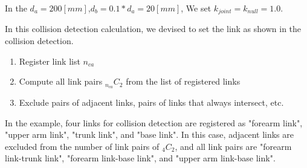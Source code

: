 In the 
$d_a = 200[mm]$,$d_b = 0.1 * d_a = 20[mm]$,
We set $k_{joint} = k_{null} = 1.0$.

In this collision detection calculation, we devised to set the link as shown in the collision detection.
\begin{enumerate}
\item Register link list $n_{ca}$
\item Compute all link pairs $_{n_{ca}}C_2$ from the list of registered links
\item Exclude pairs of adjacent links, pairs of links that always intersect, etc.
\end{enumerate}




In the example, four links for collision detection are registered as "forearm link", "upper arm link", "trunk link", and "base link".
In this case, adjacent links are excluded from the number of link pairs of $_4C_2$, and all link pairs are "forearm link-trunk link", "forearm link-base link", and "upper arm link-base link".

